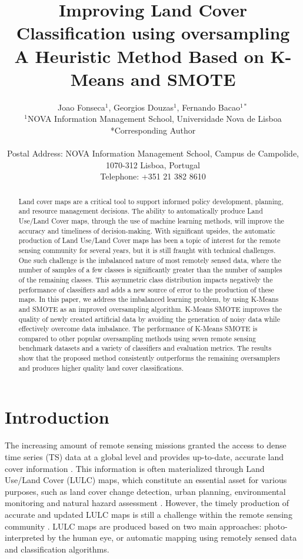 \documentclass[parskip=full]{scrartcl}
\title{Improving Land Cover Classification using oversampling\\ 
	\LARGE{A Heuristic Method Based on K-Means and SMOTE}}
\author{
	Joao Fonseca\(^{1}\), Georgios Douzas\(^{1}\), Fernando Bacao\(^{1*}\) 
	\\
	\small{\(^{1}\)NOVA Information Management School, Universidade Nova de Lisboa}
	\\
	\small{*Corresponding Author}
	\\
	\\
	\small{Postal Address: NOVA Information Management School, Campus de Campolide, 1070-312 Lisboa, Portugal}
	\\
	\small{Telephone: +351 21 382 8610}
}
\date{}
\begin{document}
\maketitle

\begin{abstract}

    Land cover maps are a critical tool to support informed policy
    development, planning, and resource management decisions. The ability to
    automatically produce Land Use/Land Cover maps, through the use of machine
    learning methods, will improve the accuracy and timeliness of
    decision-making. With significant upsides, the automatic
    production of Land Use/Land Cover maps has been a topic of interest for the
    remote sensing community for several years, but it is still fraught with
    technical challenges. One such challenge is the imbalanced nature of most
    remotely sensed data, where the number of samples of a few classes is
    significantly greater than the number of samples of the remaining classes.
    This asymmetric class distribution impacts negatively the performance of
    classifiers and adds a new source of error to the production of these
    maps. In this paper, we address the imbalanced learning problem, by using
    K-Means and SMOTE as an improved oversampling algorithm. K-Means SMOTE
    improves the quality of newly created artificial data by avoiding the
    generation of noisy data while effectively overcome data imbalance. The
    performance of K-Means SMOTE is compared to other popular oversampling
    methods using seven remote sensing benchmark datasets and a variety of
    classifiers and evaluation metrics. The results show that the proposed
    method consistently outperforms the remaining oversamplers and produces
    higher quality land cover classifications.

\end{abstract}

\section{Introduction}


The increasing amount of remote sensing missions granted the access to dense
time series (TS) data at a global level and provides up-to-date, accurate land
cover information \cite{Drusch2012}. This information is often materialized
through Land Use/Land Cover (LULC) maps, which constitute an essential asset for
various purposes, such as land cover change detection, urban planning,
environmental monitoring and natural hazard assessment \cite{Khatami2016}.
However, the timely production of accurate and updated LULC maps is still a
challenge within the remote sensing community \cite{Wulder2018}. LULC maps are
produced based on two main approaches: photo-interpreted by the human eye, or
automatic mapping using remotely sensed data and classification algorithms.
\end{document}
